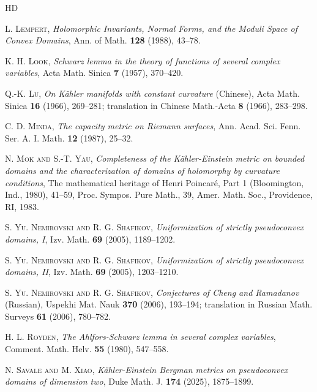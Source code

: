 \documentclass[12pt] {article}
\numberwithin{equation}{section}
\begin{document}
\begin{thebibliography}{HD}
{ 



 \textsc{L. Lempert}, \emph{Holomorphic Invariants, Normal Forms, and the Moduli Space of Convex Domains}, Ann. of Math. {\bf 128} (1988), 43--78.

 \textsc{K. H. Look}, \emph{Schwarz lemma in the theory of functions of several complex variables}, Acta Math. Sinica {\bf 7} (1957), 370--420.

 \textsc{Q.-K. Lu}, \emph{On K\"{a}hler manifolds with constant curvature} (Chinese), Acta Math. Sinica {\bf 16} (1966), 269--281; translation in Chinese Math.-Acta {\bf 8} (1966), 283--298.

 

 \textsc{C. D. Minda}, \emph{The capacity metric on Riemann surfaces}, Ann. Acad. Sci. Fenn. Ser. A. I. Math. {\bf 12} (1987), 25--32.

 \textsc{N. Mok and S.-T. Yau}, \emph{Completeness of the K\"{a}hler-Einstein metric on bounded domains and the characterization of domains of holomorphy by curvature conditions}, The mathematical heritage of Henri Poincar\'e, Part 1 (Bloomington, Ind., 1980), 41--59, Proc. Sympos. Pure Math., 39, Amer. Math. Soc., Providence, RI, 1983.

 

 \textsc{S. Yu. Nemirovski and R. G. Shafikov}, \emph{Uniformization of strictly pseudoconvex domains, I}, Izv. Math. {\bf 69} (2005), 1189--1202.

 \textsc{S. Yu. Nemirovski and R. G. Shafikov}, \emph{Uniformization of strictly pseudoconvex domains, II}, Izv. Math. {\bf 69} (2005), 1203--1210.

 \textsc{S. Yu. Nemirovski and R. G. Shafikov}, \emph{Conjectures of Cheng and Ramadanov} (Russian), Uspekhi Mat. Nauk {\bf 370} (2006), 193--194; translation in Russian Math. Surveys {\bf 61} (2006), 780--782.


 



 \textsc{H. L. Royden}, \emph{The Ahlfors-Schwarz lemma in several complex variables}, Comment. Math. Helv.  {\bf 55} (1980), 547--558.

 


 \textsc{N. Savale and M. Xiao}, \emph{K\"{a}hler-Einstein Bergman metrics on pseudoconvex domains of dimension two}, Duke Math. J. {\bf 174} (2025), 1875--1899.



}
\end{thebibliography}
\end{document}
